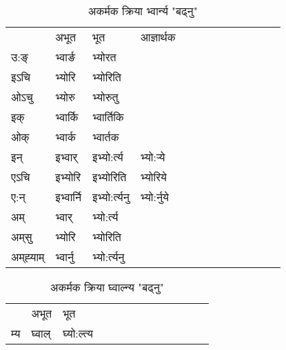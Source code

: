 \begin{table}[H]
\centering
\caption{\label{or.vi} अकर्मक क्रिया  भ्वार्न्य  "बढ्नु"  }
\begin{tabular}{l|l|l|l|l|l|l|l|l|l|l|l|l}  \toprule
&अभूत & भूत & आज्ञार्थक \\ 
उ:ङ्‌ &भ्वार्ङ &भ्योरत \\ 
इऽचि &भ्योरि &भ्योरिति   \\ 
ओऽचु &भ्योरु &भ्योरुतु   \\ 
इक् &भ्वार्कि &भ्वार्तिकि   \\ 
ओक् &भ्वार्क &भ्वार्तक   \\ 
इन् & इभ्वार् & इभ्यो:र्त्य &भ्यो:र्‍ये  \\ 
एऽचि & इभ्योरि & इभ्योरिति &भ्योरिये    \\ 
ए:न् & इभ्वार्नि  & इभ्यो:र्त्यनु &भ्यो:र्नुये  \\ 
अम् & भ्वार् & भ्यो:र्त्य   \\ 
अम्‌सु & भ्योरि & भ्योरिति   \\ 
अम्‌ह्‍याम् & भ्वार्नु  & भ्यो:र्त्यनु \\ 
\bottomrule
\end{tabular}
\end{table}


\begin{table}[H]
\centering
\caption{\label{ol.vi} अकर्मक क्रिया  घ्वाल्न्य  "बढ्नु"  }
\begin{tabular}{l|l|l|l|l|l|l|l|l|l|l|l|l}  \toprule
&अभूत & भूत   \\ 
म्य & घ्वाल् & घ्यो:ल्त्य   \\ 
\bottomrule
\end{tabular}
\end{table}


